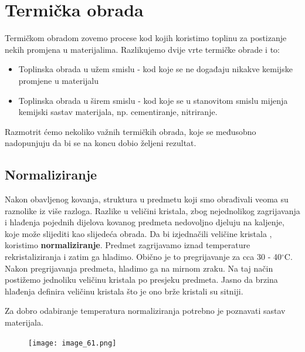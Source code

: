 \documentclass[a4paper,12pt]{article}
\numberwithin{figure}{section}
\begin{document}
\section{Termička obrada}
Termičkom obradom zovemo procese kod kojih koristimo toplinu za postizanje nekih promjena u materijalima. Razlikujemo dvije vrte termičke obrade i to:
\begin{itemize}
\item Toplinska obrada u užem smislu - kod koje se ne događaju nikakve kemijske promjene u materijalu
\item Toplinska obrada u širem smislu - kod koje se u stanovitom smislu mijenja kemijski sastav materijala, np. cementiranje, nitriranje.
\end{itemize}
Razmotrit ćemo nekoliko važnih termičkih obrada, koje se međusobno nadopunjuju da bi se na koncu dobio željeni rezultat.
\subsection{Normaliziranje}
Nakon obavljenog kovanja, struktura u predmetu koji smo obrađivali veoma su raznolike iz više razloga. Razlike u veličini kristala, zbog nejednolikog zagrijavanja i hlađenja pojednih dijelova kovanog predmeta nedovoljno djeluju na kaljenje, koje može slijediti kao slijedeća obrada. Da bi izjednačili veličine kristala , koristimo \textbf{normaliziranje}. Predmet zagrijavamo iznad temperature rekristaliziranja i zatim ga hladimo. Obično je to pregrijavanje za cca 30 - 40$^{\circ}$C. Nakon pregrijavanja predmeta, hladimo ga na mirnom zraku. Na taj način postižemo jednoliku veličinu kristala po presjeku predmeta. Jasno da brzina hlađenja definira veličinu kristala što je ono brže kristali su sitniji. \par
Za dobro odabiranje temperatura normaliziranja potrebno je poznavati sastav materijala.
\begin{figure}[!h]
\centering
\texttt{[image: image\_61.png]}
\end{figure}
\FloatBarrier
\end{document}
